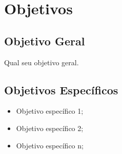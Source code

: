 \section{Objetivos}

\subsection{Objetivo Geral}

Qual seu objetivo geral.

\subsection{Objetivos Específicos}
\begin{itemize}
	\item Objetivo específico 1;
	\item Objetivo específico 2;
	\item Objetivo específico n;
\end{itemize}